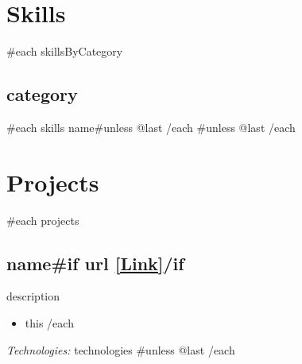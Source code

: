 \documentclass[11pt,letterpaper]{article}
\begin{document}
\section{Skills}
{{#each skillsByCategory}}
\subsection{{{category}}}
{{#each skills}}
{{name}}{{#unless @last}} 
{{/each}}
{{#unless @last}}
{{/each}}

\section{Projects}
{{#each projects}}
\subsection{{{name}}{{#if url}} \normalfont\small\href{{{url}}}{[Link]}{{/if}}}
{{description}}
\begin{itemize}[leftmargin=*]
  {{#each achievements}}
  \item {{this}}
  {{/each}}
\end{itemize}
\textit{Technologies:} {{technologies}}
{{#unless @last}}
{{/each}}
\end{document}

